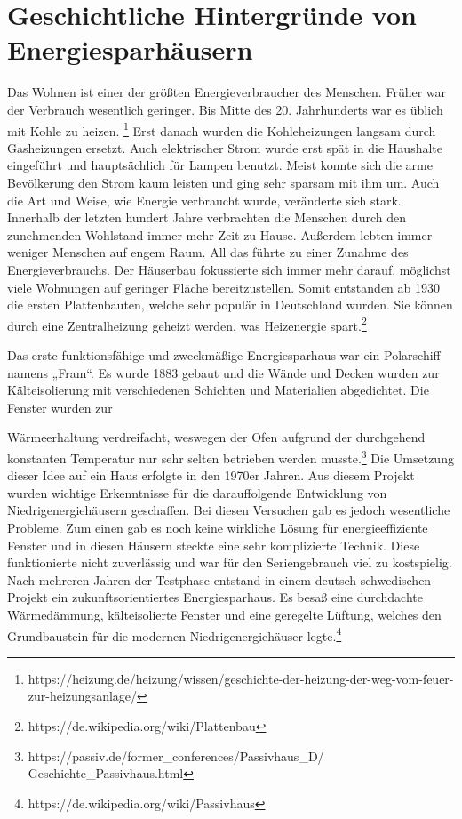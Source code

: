 \section{Geschichtliche Hintergründe von Energiesparhäusern}
Das Wohnen ist einer der größten Energieverbraucher des Menschen. Früher war der Verbrauch
wesentlich geringer. Bis Mitte des 20. Jahrhunderts war es üblich mit Kohle zu heizen.
\footnote{https://heizung.de/heizung/wissen/geschichte-der-heizung-der-weg-vom-feuer-zur-heizungsanlage/} Erst danach wurden die Kohleheizungen langsam durch Gasheizungen ersetzt.
Auch
elektrischer Strom wurde erst spät in die Haushalte eingeführt und hauptsächlich für Lampen
benutzt. Meist konnte sich die arme Bevölkerung den Strom kaum leisten und ging sehr sparsam mit ihm um. Auch die Art und Weise, wie Energie verbraucht wurde, veränderte sich stark. Innerhalb
der letzten hundert Jahre verbrachten die Menschen durch den zunehmenden Wohlstand immer
mehr Zeit zu Hause. Außerdem lebten immer weniger Menschen auf engem Raum. All das führte
zu einer Zunahme des Energieverbrauchs.
Der Häuserbau fokussierte sich immer mehr darauf, möglichst viele Wohnungen auf geringer
Fläche bereitzustellen. Somit entstanden ab 1930 die ersten Plattenbauten, welche sehr populär
in Deutschland wurden. Sie können durch eine Zentralheizung geheizt werden, was Heizenergie
spart.\footnote{https://de.wikipedia.org/wiki/Plattenbau}
\par
Das erste funktionsfähige und zweckmäßige Energiesparhaus war ein Polarschiff namens „Fram“.
Es wurde 1883 gebaut und die Wände und Decken wurden zur Kälteisolierung mit verschiedenen
Schichten und Materialien abgedichtet. Die Fenster wurden zur \par Wärmeerhaltung verdreifacht,
weswegen der Ofen aufgrund der durchgehend konstanten Temperatur nur sehr selten betrieben
werden musste.\footnote{https://passiv.de/former\_conferences/Passivhaus\_D/
Geschichte\_Passivhaus.html}
Die Umsetzung dieser Idee auf ein Haus erfolgte in den 1970er Jahren. Aus diesem Projekt
wurden wichtige Erkenntnisse für die darauffolgende Entwicklung von Niedrigenergiehäusern
geschaffen. Bei diesen Versuchen gab es jedoch wesentliche Probleme. Zum einen gab es noch
keine wirkliche Lösung für energieeffiziente Fenster und in diesen Häusern steckte eine sehr
komplizierte Technik. Diese funktionierte nicht zuverlässig und war für den Seriengebrauch viel zu
kostspielig. Nach mehreren Jahren der Testphase entstand in einem deutsch-schwedischen
Projekt ein zukunftsorientiertes Energiesparhaus. Es besaß eine durchdachte Wärmedämmung,
kälteisolierte Fenster und eine geregelte Lüftung, welches den Grundbaustein für die modernen
Niedrigenergiehäuser legte.\footnote{https://de.wikipedia.org/wiki/Passivhaus}
\newpage
